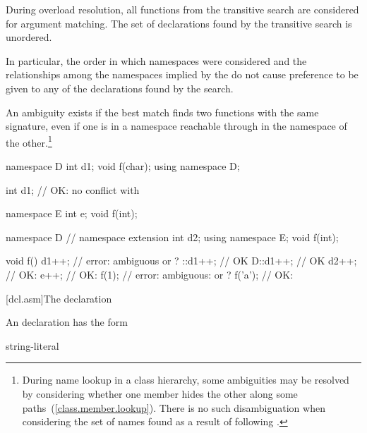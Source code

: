 \pnum
{}%
During overload resolution, all functions from the transitive search are
considered for argument matching. The set of declarations found by the
transitive search is unordered.
\begin{note}
In particular, the order in which namespaces were considered and the
relationships among the namespaces implied by the
 do not cause preference to be given to any
of the declarations found by the search.
\end{note}
An ambiguity exists if the best match finds two functions with the same
signature, even if one is in a namespace reachable through
 in the namespace of the other.\footnote{During
name lookup in a class hierarchy, some ambiguities may be
resolved by considering whether one member hides the other along some
paths~(\ref{class.member.lookup}). There is no such disambiguation when
considering the set of names found as a result of following
.}
\begin{example}

\begin{codeblock}
namespace D {
  int d1;
  void f(char);
}
using namespace D;

int d1;             // OK: no conflict with 

namespace E {
  int e;
  void f(int);
}

namespace D {       // namespace extension
  int d2;
  using namespace E;
  void f(int);
}

void f() {
  d1++;             // error: ambiguous  or ?
  ::d1++;           // OK
  D::d1++;          // OK
  d2++;             // OK: 
  e++;              // OK: 
  f(1);             // error: ambiguous:  or ?
  f('a');           // OK: 
}
\end{codeblock}
\end{example}%
%

[dcl.asm]{The  declaration}%
%
%

\pnum
An  declaration has the form

\begin{bnf}
\br
     string-literal \terminal{) ;}
\end{bnf}

